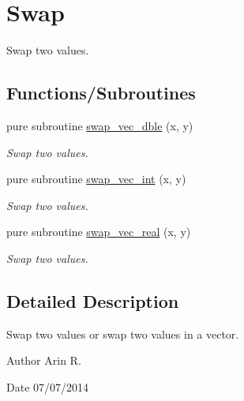 \hypertarget{group__swap}{\section{Swap}
\label{group__swap}
}


Swap two values.  


\subsection*{Functions/\-Subroutines}
\begin{DoxyCompactItemize}
\item 
pure subroutine \hyperlink{group__swap_ga6e9d7db3dfa9f9c2e233eda14dae3293_ga6e9d7db3dfa9f9c2e233eda14dae3293}{swap\-\_\-vec\-\_\-dble} (x, y)
\begin{DoxyCompactList}\small\item\em Swap two values. \end{DoxyCompactList}\item 
pure subroutine \hyperlink{group__swap_ga743926feb6c42fb3db89500ca5334f28_ga743926feb6c42fb3db89500ca5334f28}{swap\-\_\-vec\-\_\-int} (x, y)
\begin{DoxyCompactList}\small\item\em Swap two values. \end{DoxyCompactList}\item 
pure subroutine \hyperlink{group__swap_ga00ca838412dbf4399e965e8b0bf2987b_ga00ca838412dbf4399e965e8b0bf2987b}{swap\-\_\-vec\-\_\-real} (x, y)
\begin{DoxyCompactList}\small\item\em Swap two values. \end{DoxyCompactList}\end{DoxyCompactItemize}


\subsection{Detailed Description}
Swap two values or swap two values in a vector.

\begin{DoxyAuthor}{Author}
Arin R. 
\end{DoxyAuthor}
\begin{DoxyDate}{Date}
07/07/2014 
\end{DoxyDate}


